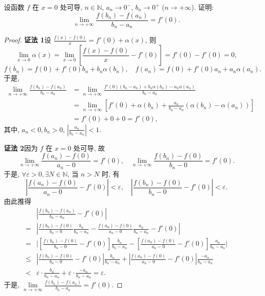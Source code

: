 \begin{example}\label{ex:3.1.13}
设函数 $f$ 在 $x=0$ 处可导, $n \in \mathbb{N}$, $a_n \to 0^-$, $b_n \to 0^+$ ($n \to +\infty$). 证明:
\[
\lim_{n\to+\infty}\frac{f(b_n) - f(a_n)}{b_n - a_n} = f'(0).
\]
\end{example}

\begin{proof}
\textbf{证法 1}\quad 设 $\frac{f(x) - f(0)}{x} = f'(0) + \alpha(x)$, 则
\[
\lim_{x\to0}\alpha(x) = \lim_{x\to0}\left[\frac{f(x) - f(0)}{x} - f'(0)\right] = f'(0) - f'(0) = 0,
\]
\[
f(b_n) = f(0) + f'(0)b_n + b_n\alpha(b_n),\quad f(a_n) = f(0) + f'(0)a_n + a_n\alpha(a_n).
\]
于是,
\[
\begin{aligned}
\lim_{n\to+\infty}\frac{f(b_n) - f(a_n)}{b_n - a_n}
&= \lim_{n\to+\infty}\frac{f'(0)(b_n - a_n) + b_n\alpha(b_n) - a_n\alpha(a_n)}{b_n - a_n}\\
&= \lim_{n\to+\infty}\left[f'(0) + \alpha(b_n) + \frac{a_n}{b_n - a_n}(\alpha(b_n) - \alpha(a_n))\right]\\
&= f'(0) + 0 + 0 = f'(0),
\end{aligned}
\]
其中, $a_n < 0, b_n > 0$, $\left|\frac{a_n}{b_n - a_n}\right| < 1$.

\textbf{证法 2}\quad 因为 $f$ 在 $x=0$ 处可导, 故
\[
\lim_{n\to+\infty}\frac{f(a_n) - f(0)}{a_n - 0} = f'(0),\quad \lim_{n\to+\infty}\frac{f(b_n) - f(0)}{b_n - 0} = f'(0).
\]
于是, $\forall \varepsilon > 0, \exists N \in \mathbb{N}$, 当 $n > N$ 时, 有
\[
\left|\frac{f(a_n) - f(0)}{a_n - 0} - f'(0)\right| < \varepsilon,\quad \left|\frac{f(b_n) - f(0)}{b_n - 0} - f'(0)\right| < \varepsilon.
\]
由此推得
\[
\begin{aligned}
&\left|\frac{f(b_n) - f(a_n)}{b_n - a_n} - f'(0)\right|\\
={}&\left|\frac{f(b_n) - f(0)}{b_n - 0}\frac{b_n}{b_n - a_n} - \frac{f(a_n) - f(0)}{a_n - 0}\frac{a_n}{b_n - a_n} - f'(0)\right|\\
={}&\Bigg|\left[\frac{f(b_n) - f(0)}{b_n - 0} - f'(0)\right]\frac{b_n}{b_n - a_n} - \left[\frac{f(a_n) - f(0)}{a_n - 0} - f'(0)\right]\frac{a_n}{b_n - a_n}\Bigg|\\
\leqslant{}&\left|\frac{f(b_n) - f(0)}{b_n - 0} - f'(0)\right|\frac{b_n}{b_n - a_n} + \left|\frac{f(a_n) - f(0)}{a_n - 0} - f'(0)\right|\frac{-a_n}{b_n - a_n}\\
<{}&\varepsilon\cdot\frac{b_n}{b_n - a_n} + \varepsilon\cdot\frac{-a_n}{b_n - a_n} = \varepsilon.
\end{aligned}
\]
于是, $\lim\limits_{n\to+\infty}\frac{f(b_n) - f(a_n)}{b_n - a_n} = f'(0)$.
\end{proof}

